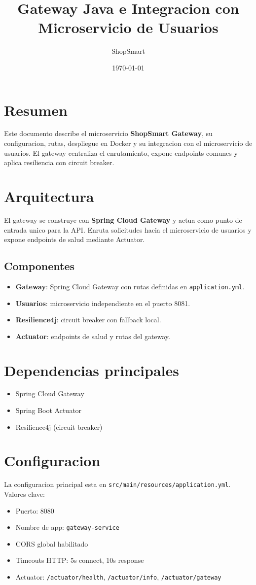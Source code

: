 \documentclass[11pt,a4paper]{article}
\title{Gateway Java e Integracion con Microservicio de Usuarios}
\author{ShopSmart}
\date{\today}
\begin{document}
\maketitle

\section{Resumen}
Este documento describe el microservicio \textbf{ShopSmart Gateway}, su configuracion, rutas, despliegue en Docker y su integracion con el microservicio de usuarios. El gateway centraliza el enrutamiento, expone endpoints comunes y aplica resiliencia con circuit breaker.

\section{Arquitectura}
El gateway se construye con \textbf{Spring Cloud Gateway} y actua como punto de entrada unico para la API. Enruta solicitudes hacia el microservicio de usuarios y expone endpoints de salud mediante Actuator.

\subsection*{Componentes}
\begin{itemize}
  \item \textbf{Gateway}: Spring Cloud Gateway con rutas definidas en \texttt{application.yml}.
  \item \textbf{Usuarios}: microservicio independiente en el puerto 8081.
  \item \textbf{Resilience4j}: circuit breaker con fallback local.
  \item \textbf{Actuator}: endpoints de salud y rutas del gateway.
\end{itemize}

\section{Dependencias principales}
\begin{itemize}
  \item Spring Cloud Gateway
  \item Spring Boot Actuator
  \item Resilience4j (circuit breaker)
\end{itemize}

\section{Configuracion}
La configuracion principal esta en \texttt{src/main/resources/application.yml}. Valores clave:
\begin{itemize}
  \item Puerto: 8080
  \item Nombre de app: \texttt{gateway-service}
  \item CORS global habilitado
  \item Timeouts HTTP: 5s connect, 10s response
  \item Actuator: \texttt{/actuator/health}, \texttt{/actuator/info}, \texttt{/actuator/gateway}
\end{itemize}
\end{document}
